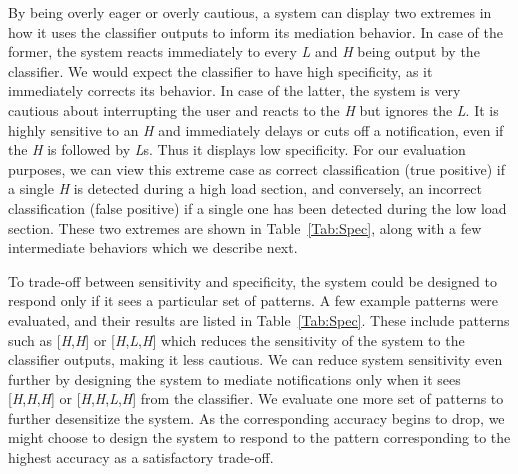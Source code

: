 By being overly eager or overly cautious, a system can display two extremes in how it uses the classifier outputs to inform its mediation behavior. In case of the former, the system reacts immediately to every \textit{L} and \textit{H} being output by the classifier. We would expect the classifier to have high specificity, as it immediately corrects its behavior. In case of the latter, the system is very cautious about interrupting the user and reacts to the \textit{H} but ignores the \textit{L}. It is highly sensitive to an \textit{H} and immediately delays or cuts off a notification, even if the \textit{H} is followed by \textit{L}s. Thus it displays low specificity. For our evaluation purposes, we can view this extreme case as correct classification (true positive) if a single \textit{H} is detected during a high load section, and conversely, an incorrect classification (false positive) if a single one has been detected during the low load section. These two extremes are shown in Table~\ref{Tab:Spec}, along with a few intermediate behaviors which we describe next.

To trade-off between sensitivity and specificity, the system could be designed to respond only if it sees a particular set of patterns. A few example patterns were evaluated, and their results are listed in Table~\ref{Tab:Spec}. These include patterns such as [\textit{H},\textit{H}] or [\textit{H},\textit{L},\textit{H}] which reduces the sensitivity of the system to the classifier outputs, making it less cautious. We can reduce system sensitivity even further by designing the system to mediate notifications only when it sees [\textit{H},\textit{H},\textit{H}] or [\textit{H},\textit{H},\textit{L},\textit{H}] from the classifier. We evaluate one more set of patterns to further desensitize the system. As the corresponding accuracy begins to drop, we might choose to design the system to respond to the pattern corresponding to the highest accuracy as a satisfactory trade-off.  


